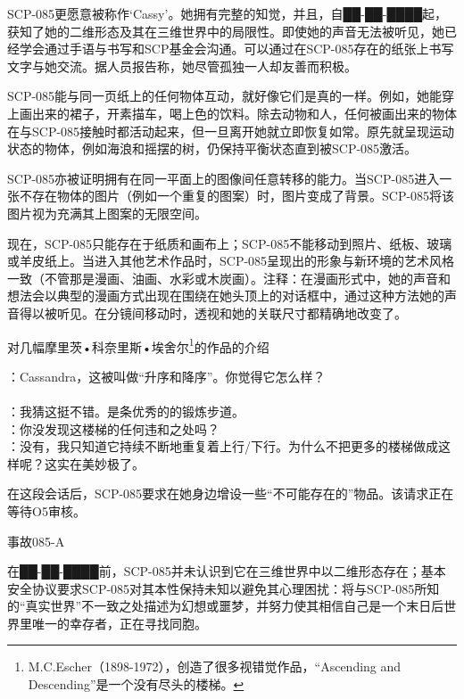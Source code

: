 SCP-085更愿意被称作‘Cassy’。她拥有完整的知觉，并且，自██-██-████起，获知了她的二维形态及其在三维世界中的局限性。即使她的声音无法被听见，她已经学会通过手语与书写和SCP基金会沟通。可以通过在SCP-085存在的纸张上书写文字与她交流。据人员报告称，她尽管孤独一人却友善而积极。

SCP-085能与同一页纸上的任何物体互动，就好像它们是真的一样。例如，她能穿上画出来的裙子，开素描车，喝上色的饮料。除去动物和人，任何被画出来的物体在与SCP-085接触时都活动起来，但一旦离开她就立即恢复如常。原先就呈现运动状态的物体，例如海浪和摇摆的树，仍保持平衡状态直到被SCP-085激活。

SCP-085亦被证明拥有在同一平面上的图像间任意转移的能力。当SCP-085进入一张不存在物体的图片（例如一个重复的图案）时，图片变成了背景。SCP-085将该图片视为充满其上图案的无限空间。

现在，SCP-085只能存在于纸质和画布上；SCP-085不能移动到照片、纸板、玻璃或羊皮纸上。当进入其他艺术作品时，SCP-085呈现出的形象与新环境的艺术风格一致（不管那是漫画、油画、水彩或木炭画）。注释：在漫画形式中，她的声音和想法会以典型的漫画方式出现在围绕在她头顶上的对话框中，通过这种方法她的声音得以被听见。在分镜间移动时，透视和她的关联尺寸都精确地改变了。

\hr

对几幅摩里茨•科奈里斯•埃舍尔\footnote{M.C.Escher（1898-1972），创造了很多视错觉作品，“Ascending and Descending”是一个没有尽头的楼梯。}的作品的介绍

\begin{scpbox}

：Cassandra，这被叫做“升序和降序”。你觉得它怎么样？\\
\\
：我猜这挺不错。是条优秀的的锻炼步道。\\
：你没发现这楼梯的任何违和之处吗？\\
：没有，我只知道它持续不断地重复着上行\slash 下行。为什么不把更多的楼梯做成这样呢？这实在美妙极了。

\end{scpbox}

在这段会话后，SCP-085要求在她身边增设一些“不可能存在的”物品。该请求正在等待O5审核。

\hr

事故085-A

在██-██-████前，SCP-085并未认识到它在三维世界中以二维形态存在；基本安全协议要求SCP-085对其本性保持未知以避免其心理困扰：将与SCP-085所知的“真实世界”不一致之处描述为幻想或噩梦，并努力使其相信自己是一个末日后世界里唯一的幸存者，正在寻找同胞。

